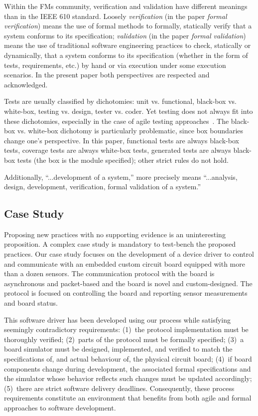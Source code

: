 \documentclass[english]{lni}
\begin{document}
Within the FMs community, verification and validation have different meanings than in the IEEE 610 standard.
Loosely \emph{verification} (in the paper \emph{formal verification}) means the use of formal methods to formally, statically verify that a system conforms to its specification; \emph{validation} (in the paper \emph{formal validation}) means the use of traditional software engineering practices to check, statically or dynamically, that a system conforms to its specification (whether in the form of tests, requirements, etc.) by hand or via execution under some execution scenarios.
In the present paper both perspectives are respected and acknowledged.

Tests are usually classified by dichotomies: unit vs. functional, black-box vs. white-box, testing vs. design, tester vs. coder. 
Yet testing does not always fit into these dichotomies, especially in the case of agile testing approaches~\cite{Beck2007}.
The black-box vs. white-box dichotomy is particularly problematic, since box boundaries change one's perspective.
In this paper, functional tests are always black-box tests, coverage tests are always white-box tests, generated tests are always black-box tests (the box is the module specified); other strict rules do not hold.

Additionally, ``...development of a system,'' more precisely means ``...analysis, design, development, verification, formal validation of a system.''



\subsection{Case Study}
\label{sec:case-study}

Proposing new practices with no supporting evidence is an uninteresting proposition.  
A complex case study is mandatory to test-bench the proposed practices.  
Our case study focuses on the development of a device driver to control and communicate with an embedded custom circuit board equipped with more than a dozen sensors.
The communication protocol with the board is asynchronous and packet-based and the board is novel and custom-designed.  
The protocol is focused on controlling the board and reporting sensor measurements and board status.

This software driver has been developed using our process while satisfying seemingly contradictory requirements: (1)~the protocol implementation must be thoroughly verified; (2)~parts of the protocol must be formally specified; (3)~a board simulator must be designed, implemented, and verified to match the specifications of, and actual behaviour of, the physical circuit board; (4)~if board components change during development, the associated formal specifications and the simulator whose behavior reflects such changes must be updated accordingly; (5)~there are strict software delivery deadlines.  
Consequently, these process requirements constitute an environment that benefits from both agile and formal approaches to software development.
\end{document}
